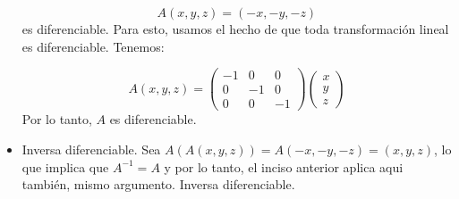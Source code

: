 \begin{problema}
\begin{dem}
\begin{itemize}
            $$A(x,y,z)=(-x,-y,-z)$$
            es diferenciable. Para esto, usamos el hecho de que toda transformación lineal es diferenciable. Tenemos: 

            $$A(x, y, z)=\left(\begin{array}{ccc}-1 & 0 & 0 \\ 0 & -1 & 0 \\ 0 & 0 & -1\end{array}\right)\left(\begin{array}{l}x \\ y \\ z\end{array}\right)$$
            Por lo tanto, $A$ es diferenciable. 

            \item Inversa diferenciable. Sea $A(A(x,y,z))=A(-x,-y,-z)=(x,y,z)$, lo que implica que $A^{-1}=A$ y por lo tanto, el inciso anterior aplica aqui también, mismo argumento. Inversa diferenciable. 

            
        \end{itemize}
    \end{dem}
    
\end{problema}

